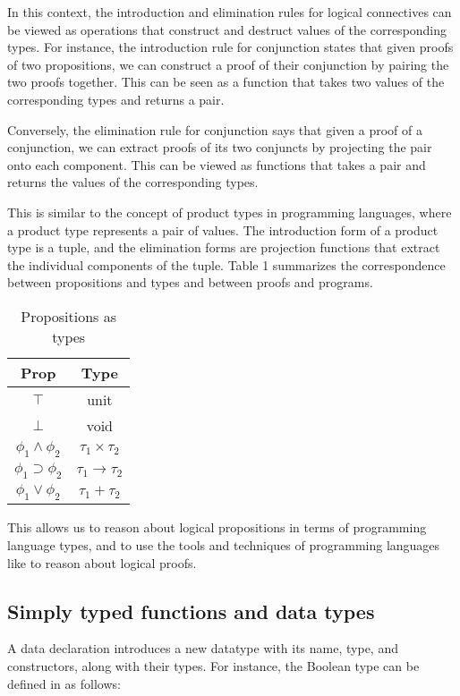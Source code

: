 \documentclass[titlepage]{article}
\begin{document}
In this context, the introduction and elimination rules for logical connectives can be viewed as operations that construct and destruct values of the corresponding types. For instance, the introduction rule for conjunction states that given proofs of two propositions, we can construct a proof of their conjunction by pairing the two proofs together. This can be seen as a function that takes two values of the corresponding types and returns a pair.

Conversely, the elimination rule for conjunction says that given a proof of a conjunction, we can extract proofs of its two conjuncts by projecting the pair onto each component. This can be viewed as functions that takes a pair and returns the values of the corresponding types.

This is similar to the concept of product types in programming languages, where a product type represents a pair of values. The introduction form of a product type is a tuple, and the elimination forms are projection functions that extract the individual components of the tuple. Table 1 summarizes the correspondence between propositions and types and between proofs and programs.

\begin{table}[h!]
    \centering
    \begin{tabular}{c | c}
        Prop & Type \\
        \hline
        $\top$ & unit \\
        $\bot$ & void \\
        $\phi_1 \wedge \phi_2$ & $\tau_1 \times \tau_2$ \\
        $\phi_1 \supset \phi_2$ & $\tau_1 \to \tau_2$ \\
        $\phi_1 \vee \phi_2$ & $\tau_1 + \tau_2$
    \end{tabular}
    \caption{Propositions as types}
\end{table}

This allows us to reason about logical propositions in terms of programming language types, and to use the tools and techniques of programming languages like \Agda to reason about logical proofs.


\subsection{Simply typed functions and data types}

A data declaration introduces a new datatype with its name, type, and constructors, along with their types. For instance, the Boolean type can be defined in \Agda as follows:
\end{document}
